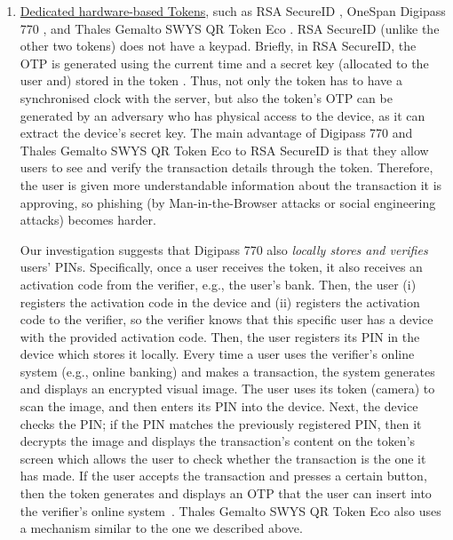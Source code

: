 \begin{enumerate}
\item \underline{Dedicated hardware-based Tokens}, such as RSA SecureID \cite{secureID}, OneSpan Digipass 770 \cite{Digipass-website}, and Thales Gemalto SWYS QR Token Eco \cite{Gemalto}.   RSA SecureID (unlike the other two tokens) does not have a keypad. Briefly, in RSA SecureID, the OTP is generated using the current time and a secret key (allocated to the user and) stored in the token \cite{biryukov2003cryptanalysis}. Thus, not only the token has to have a synchronised clock with the server, but also the token's OTP can be generated by an adversary who has physical access to the device, as it can extract the device's secret key.  The main advantage of  Digipass 770 and Thales Gemalto SWYS QR Token Eco to RSA SecureID is that they allow users to see and verify the transaction details through the token. Therefore, the user is given more understandable information about the transaction it is approving,
so phishing (by Man-in-the-Browser attacks or social engineering attacks) becomes harder. 

 

Our investigation suggests that Digipass 770 also \emph{locally stores and verifies} users' PINs. 
%
Specifically, once a user receives the token, it also receives an activation code from the verifier, e.g., the user's bank.  Then, the user (i) registers the activation code in the device and (ii) registers the activation code to the verifier, so the verifier knows that this specific user has a device with the provided activation code. Then, the user registers its PIN in the device which stores it locally. Every time a user uses the verifier's online system  (e.g., online banking) and makes a transaction, the system generates and displays an encrypted visual image. The user uses its token (camera) to scan the image, and then enters its PIN into the device. Next, the device checks the PIN; if the PIN matches the previously registered PIN, then it decrypts the image and displays the transaction's content on the token's screen which allows the user to check whether the transaction is the one it has made. If the user accepts the transaction and presses a certain button, then the token generates and displays an OTP that the user can insert into the verifier's online system~\cite{Digipass-website}.  Thales Gemalto SWYS QR Token Eco also uses a mechanism similar to the one we described above. 


\end{enumerate}
